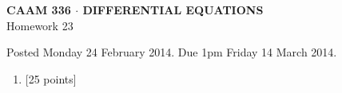 \documentclass[10pt]{article}
\begin{document}
\vspace*{-5em}
\begin{center}
\large \textsf{\textbf{CAAM 336 $\cdot$ DIFFERENTIAL EQUATIONS}\\[0.5em]
Homework 23 }
\end{center}

Posted Monday 24 February 2014. Due 1pm Friday 14 March 2014.

\begin{enumerate}\addtocounter{enumi}{22}
\item {[25 points]}  
\end{enumerate}
\end{document}
